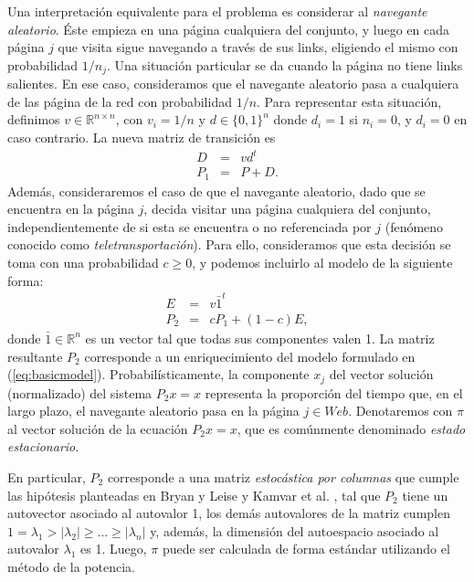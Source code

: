 Una interpretaci\'on equivalente para el problema es considerar al \emph{navegante aleatorio}. \'Este empieza en una
p\'agina cualquiera del conjunto, y luego en cada p\'agina $j$ que visita sigue navegando a trav\'es de sus links,
eligiendo el mismo con probabilidad $1/n_j$. Una situaci\'on particular se da cuando la p\'agina no tiene links salientes. En
ese caso, consideramos que el navegante aleatorio pasa a cualquiera de las p\'agina de la red con probabilidad $1/n$.
Para representar esta situaci\'on, definimos $v \in \mathbb{R}^{n \times n}$, con $v_i = 1/n$ y $d \in \{0,1\}^{n}$ donde 
$d_i = 1$ si $n_i = 0$, y $d_i = 0$ en caso contrario. La nueva matriz de transici\'on es 
\begin{eqnarray*}
D & = & v d^t \\
P_1 & = & P + D.
\end{eqnarray*}
Adem\'as, consideraremos el caso de que el navegante aleatorio, dado que se encuentra en la p\'agina $j$, decida visitar
una p\'agina cualquiera del conjunto, independientemente de si esta se encuentra o no referenciada por $j$ (fen\'omeno
conocido como \emph{teletransportaci\'on}). Para ello, consideramos que esta decisi\'on se toma con una probabilidad
$c \ge 0$, y podemos incluirlo al modelo de la siguiente forma:
\begin{eqnarray*}
E & = & v \bar{1}^t \\
P_2 & = & cP_1 + (1-c)E,
\end{eqnarray*}
\noindent donde $\bar{1} \in \mathbb{R}^n$ es un vector tal que todas sus componentes valen 1. La matriz resultante
$P_2$ corresponde a un enriquecimiento del modelo formulado en (\ref{eq:basicmodel}). Probabil\'isticamente, la
componente $x_j$ del vector soluci\'on (normalizado) del sistema $P_2 x = x$ representa la proporci\'on del tiempo que,
en el largo plazo, el navegante aleatorio pasa en la p\'agina $j \in Web$. Denotaremos con $\pi$ al vector soluci\'on 
de la ecuaci\'on $P_2 x = x$, que es com\'unmente denominado \emph{estado estacionario}.

En particular, $P_2$ corresponde a una
matriz \emph{estoc\'astica por columnas} que cumple las hip\'otesis planteadas en Bryan y Leise \cite{Bryan2006} y
Kamvar et al. \cite{Kamvar2003}, tal que $P_2$ tiene un autovector asociado al autovalor 1, los dem\'as autovalores de
la matriz cumplen $1 = \lambda_1 > |\lambda_2| \ge \dots \ge |\lambda_n|$ y, adem\'as, la dimensi\'on
del autoespacio asociado al autovalor $\lambda_1$ es 1. Luego, $\pi$ puede ser calculada
de forma est\'andar utilizando el m\'etodo de la potencia.

